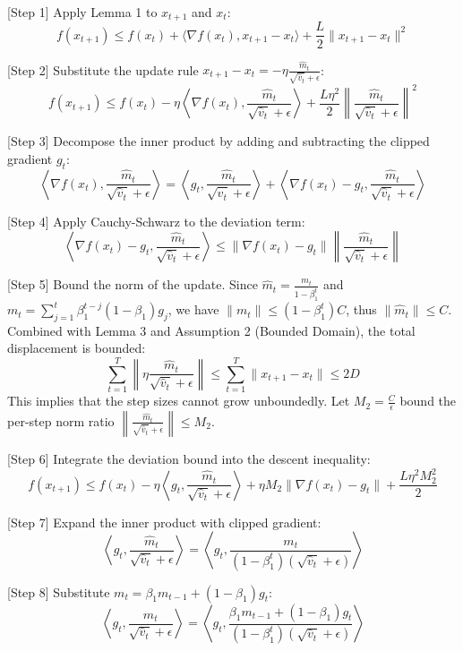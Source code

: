 \documentclass{article}
\begin{document}
[Step 1] Apply Lemma 1 to $x_{t+1}$ and $x_t$:
$$ f(x_{t+1}) \leq f(x_t) + \langle \nabla f(x_t), x_{t+1} - x_t \rangle + \frac{L}{2} \|x_{t+1} - x_t\|^2 $$

[Step 2] Substitute the update rule $x_{t+1} - x_t = -\eta \frac{\hat{m}_t}{\sqrt{\hat{v}_t} + \epsilon}$:
$$ f(x_{t+1}) \leq f(x_t) - \eta \left\langle \nabla f(x_t), \frac{\hat{m}_t}{\sqrt{\hat{v}_t} + \epsilon} \right\rangle + \frac{L \eta^2}{2} \left\| \frac{\hat{m}_t}{\sqrt{\hat{v}_t} + \epsilon} \right\|^2 $$

[Step 3] Decompose the inner product by adding and subtracting the clipped gradient $g_t$:
$$ \left\langle \nabla f(x_t), \frac{\hat{m}_t}{\sqrt{\hat{v}_t} + \epsilon} \right\rangle = \left\langle g_t, \frac{\hat{m}_t}{\sqrt{\hat{v}_t} + \epsilon} \right\rangle + \left\langle \nabla f(x_t) - g_t, \frac{\hat{m}_t}{\sqrt{\hat{v}_t} + \epsilon} \right\rangle $$

[Step 4] Apply Cauchy-Schwarz to the deviation term:
$$ \left\langle \nabla f(x_t) - g_t, \frac{\hat{m}_t}{\sqrt{\hat{v}_t} + \epsilon} \right\rangle \leq \|\nabla f(x_t) - g_t\| \left\| \frac{\hat{m}_t}{\sqrt{\hat{v}_t} + \epsilon} \right\| $$

[Step 5] Bound the norm of the update. Since $\hat{m}_t = \frac{m_t}{1-\beta_1^t}$ and $m_t = \sum_{j=1}^t \beta_1^{t-j} (1-\beta_1) g_j$, we have $\|m_t\| \leq (1-\beta_1^t) C$, thus $\|\hat{m}_t\| \leq C$. %
Combined with Lemma 3 and Assumption 2 (Bounded Domain), the total displacement is bounded:
$$ \sum_{t=1}^T \left\| \eta \frac{\hat{m}_t}{\sqrt{\hat{v}_t} + \epsilon} \right\| \leq \sum_{t=1}^T \|x_{t+1} - x_t\| \leq 2D $$
This implies that the step sizes cannot grow unboundedly. Let $M_2 = \frac{C}{\epsilon}$ bound the per-step norm ratio $\left\| \frac{\hat{m}_t}{\sqrt{\hat{v}_t} + \epsilon} \right\| \leq M_2$.

[Step 6] Integrate the deviation bound into the descent inequality:
$$ f(x_{t+1}) \leq f(x_t) - \eta \left\langle g_t, \frac{\hat{m}_t}{\sqrt{\hat{v}_t} + \epsilon} \right\rangle + \eta M_2 \|\nabla f(x_t) - g_t\| + \frac{L \eta^2 M_2^2}{2} $$

[Step 7] Expand the inner product with clipped gradient:
$$ \left\langle g_t, \frac{\hat{m}_t}{\sqrt{\hat{v}_t} + \epsilon} \right\rangle = \left\langle g_t, \frac{m_t}{(1-\beta_1^t)(\sqrt{\hat{v}_t} + \epsilon)} \right\rangle $$

[Step 8] Substitute $m_t = \beta_1 m_{t-1} + (1-\beta_1) g_t$:
$$ \left\langle g_t, \frac{\hat{m}_t}{\sqrt{\hat{v}_t} + \epsilon} \right\rangle = \left\langle g_t, \frac{\beta_1 m_{t-1} + (1-\beta_1) g_t}{(1-\beta_1^t)(\sqrt{\hat{v}_t} + \epsilon)} \right\rangle $$
\end{document}
